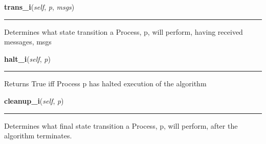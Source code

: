     \label{datk:core:distalgs:Algorithm:trans_i}

    \vspace{0.5ex}

\hspace{.8\funcindent}\begin{boxedminipage}{\funcwidth}

    \raggedright \textbf{trans\_i}(\textit{self}, \textit{p}, \textit{msgs})

    \vspace{-1.5ex}

    \rule{\textwidth}{0.5\fboxrule}
\setlength{\parskip}{2ex}
    Determines what state transition a Process, p, will perform, having 
    received messages, msgs

\setlength{\parskip}{1ex}
    \end{boxedminipage}

    \label{datk:core:distalgs:Algorithm:halt_i}

    \vspace{0.5ex}

\hspace{.8\funcindent}\begin{boxedminipage}{\funcwidth}

    \raggedright \textbf{halt\_i}(\textit{self}, \textit{p})

    \vspace{-1.5ex}

    \rule{\textwidth}{0.5\fboxrule}
\setlength{\parskip}{2ex}
    Returns True iff Process p has halted execution of the algorithm

\setlength{\parskip}{1ex}
    \end{boxedminipage}

    \label{datk:core:distalgs:Algorithm:cleanup_i}

    \vspace{0.5ex}

\hspace{.8\funcindent}\begin{boxedminipage}{\funcwidth}

    \raggedright \textbf{cleanup\_i}(\textit{self}, \textit{p})

    \vspace{-1.5ex}

    \rule{\textwidth}{0.5\fboxrule}
\setlength{\parskip}{2ex}
    Determines what final state transition a Process, p, will perform, 
    after the algorithm terminates.

\setlength{\parskip}{1ex}
    \end{boxedminipage}

